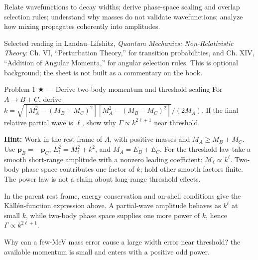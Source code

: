 \documentclass[11pt]{article}
\begin{document}

\begin{goals}
Relate wavefunctions to decay widths; derive phase-space scaling and overlap
selection rules; understand why masses do not validate wavefunctions; analyze
how mixing propagates coherently into amplitudes.
\end{goals}
\begin{reading}
Selected reading in Landau--Lifshitz, \emph{Quantum Mechanics: Non-Relativistic
Theory}: Ch. VI, ``Perturbation Theory,'' for transition probabilities, and
Ch. XIV, ``Addition of Angular Momenta,'' for angular selection rules. This is
optional background; the sheet is not built as a commentary on the book.
\end{reading}


\begin{problem}{Problem 1 ★ — Derive two-body momentum and threshold scaling}
For $A\to B+C$, derive
$k=\sqrt{[M_A^2-(M_B+M_C)^2][M_A^2-(M_B-M_C)^2]}/(2M_A)$.
If the final relative partial wave is $\ell$, show why
$\Gamma\propto k^{2\ell+1}$ near threshold.

\textbf{Hint:} Work in the rest frame of $A$, with positive masses and
$M_A\ge M_B+M_C$. Use $\bm p_B=-\bm p_C$,
$E_i^2=M_i^2+k^2$, and $M_A=E_B+E_C$.
For the threshold law take a smooth short-range amplitude with a nonzero
leading coefficient: $\mathcal M_\ell\propto k^\ell$.
Two-body phase space contributes one factor of $k$; hold other smooth
factors finite. The power law is not a claim about long-range threshold effects.
\end{problem}
\begin{solution}
In the parent rest frame, energy conservation and on-shell conditions give the
K\"all\'en-function expression above. A partial-wave amplitude behaves as
$k^\ell$ at small $k$, while two-body phase space supplies one more power of
$k$, hence $\Gamma\propto k^{2\ell+1}$.
\end{solution}
\begin{quiz}
Why can a few-MeV mass error cause a large width error near threshold? \answer
the available momentum is small and enters with a positive odd power.
\end{quiz}
\end{document}
